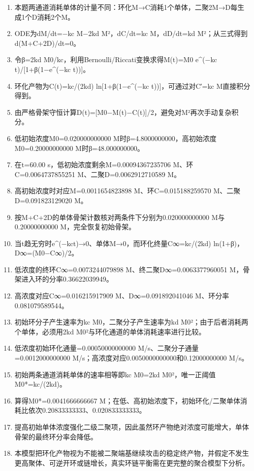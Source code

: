 \documentclass[UTF8,11pt,a4paper]{ctexart}
\begin{document}
\begin{enumerate}
\item 本题两通道消耗单体的计量不同：环化M→C消耗1个单体，二聚2M→D每生成1个D消耗2个M。
\item ODE为dM/dt=−kc M−2kd M²，dC/dt=kc M，dD/dt=kd M²；从三式得到d(M+C+2D)/dt=0。
\item 令β=2kd M0/kc，利用Bernoulli/Riccati变换求得M(t)=M0 e\textasciicircum{}(−kc t)/[1+β(1−e\textasciicircum{}(−kc t))]。
\item 环化产物为C(t)=kc/(2kd) ln[1+β(1−e\textasciicircum{}(−kc t))]，可通过对C′=kc M直接积分得到。
\item 由严格骨架守恒计算D(t)=[M0−M(t)−C(t)]/2，避免对M²再次手动复杂积分。
\item 低初始浓度M0=0.020000000000 M时β=4.8000000000，高初始浓度M0=0.20000000000 M时β=48.000000000。
\item 在t=60.00 s，低初始浓度剩余M=0.00094367235706 M、环C=0.0064737855251 M、二聚D=0.0062912710589 M。
\item 高初始浓度时对应M=0.0011654823898 M、环C=0.015188259570 M、二聚D=0.091823129020 M。
\item 按M+C+2D的单体骨架计数核对两条件下分别为0.020000000000 M与0.20000000000 M，完全恢复初始骨架。
\item 当t趋无穷时e\textasciicircum{}(−kct)→0、单体M→0，而环化终量C∞=kc/(2kd) ln(1+β)，D∞=(M0−C∞)/2。
\item 低浓度的终环C∞=0.0073244079898 M、终二聚D∞=0.0063377960051 M，骨架进入环的分率0.36622039949。
\item 高浓度对应C∞=0.016215917909 M、D∞=0.091892041046 M、环分率0.081079589544。
\item 初始环分子产生速率为kc M0，二聚分子产生速率为kd M0²；由于后者消耗两个单体，必须用2kd M0²与环化通道的单体消耗速率进行比较。
\item 低浓度初始环化通量=0.00050000000000 M/s、二聚分子通量=0.0012000000000 M/s；高浓度对应0.0050000000000和0.12000000000 M/s。
\item 初始两条通道消耗单体的速率相等即kc M0=2kd M0²，唯一正阈值M0*=kc/(2kd)。
\item 算得M0*=0.0041666666667 M；在低、高初始浓度下，初始环化/二聚单体消耗比依次0.20833333333、0.020833333333。
\item 提高初始单体浓度强化二级二聚项，因此虽然环产物绝对浓度可能增大，单体骨架的最终环分率会降低。
\item 本模型把环化产物视为不能被二聚端基继续攻击的稳定终产物，并假定不发生更高聚体、可逆开环或链增长，真实环链平衡需在更完整的聚合模型下分析。
\end{enumerate}
\end{document}
